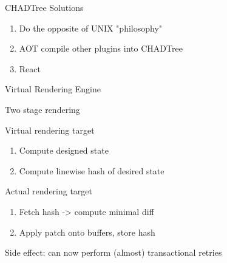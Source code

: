 \documentclass{beamer}
\begin{document}
\begin{frame}{CHADTree Solutions}


	\begin{enumerate}

		\item Do the opposite of UNIX "philosophy"


		\item AOT compile other plugins into CHADTree

		\item React


	\end{enumerate}


\end{frame}



\begin{frame}{Virtual Rendering Engine}


	Two stage rendering

	Virtual rendering target

	\begin{enumerate}

		\item Compute designed state


		\item Compute linewise hash of desired state

	\end{enumerate}


	Actual rendering target

	\begin{enumerate}

		\item Fetch hash -> compute minimal diff


		\item Apply patch onto buffers, store hash


	\end{enumerate}


	Side effect: can now perform (almost) transactional retries



\end{frame}
\end{document}
